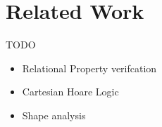 \documentclass[p.tex]{subfiles}
\begin{document}
\section{Related Work}\label{sec:related-work}

TODO
\begin{itemize}
  \item Relational Property verifcation
  \item Cartesian Hoare Logic
  \item Shape analysis
\end{itemize}
\end{document}
